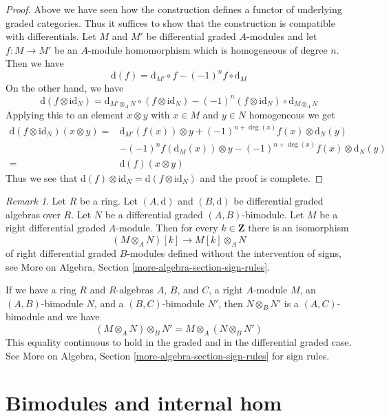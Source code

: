 \documentclass{stacks-project}
\theoremstyle{plain}
\theoremstyle{definition}
\theoremstyle{remark}
\newtheorem{remark}[subsection]{Remark}
\numberwithin{equation}{subsection}
\begin{document}
\begin{proof}
Above we have seen how the construction defines a functor of underlying
graded categories. Thus it suffices to show that the construction is
compatible with differentials. Let $M$ and $M'$ be differential
graded $A$-modules and let $f : M \to M'$ be an $A$-module homomorphism
which is homogeneous of degree $n$. Then we have
$$
\text{d}(f) = \text{d}_{M'} \circ f - (-1)^n f \circ \text{d}_M
$$
On the other hand, we have
$$
\text{d}(f \otimes \text{id}_N) =
\text{d}_{M' \otimes_A N} \circ
(f \otimes \text{id}_N)
- (-1)^n
(f \otimes \text{id}_N) \circ \text{d}_{M \otimes_A N}
$$
Applying this to an element $x \otimes y$ with $x \in M$ and
$y \in N$ homogeneous we get
\begin{align*}
\text{d}(f \otimes \text{id}_N)(x \otimes y)
= &
\text{d}_{M'}(f(x)) \otimes y + (-1)^{n + \deg(x)}f(x) \otimes \text{d}_N(y) \\
& - (-1)^n f(\text{d}_M(x)) \otimes y
- (-1)^{n + \deg(x)}f(x) \otimes \text{d}_N(y) \\
= &
\text{d}(f) (x \otimes y)
\end{align*}
Thus we see that $\text{d}(f) \otimes \text{id}_N =
\text{d}(f \otimes \text{id}_N)$ and the proof is complete.
\end{proof}

\begin{remark}
\label{remark-shift-tensor-no-sign}
Let $R$ be a ring. Let $(A, \text{d})$ and $(B, \text{d})$
be differential graded algebras over $R$. Let $N$ be a
differential graded $(A, B)$-bimodule. Let $M$ be a right differential
graded $A$-module. Then for every $k \in \mathbf{Z}$ there
is an isomorphism
$$
(M \otimes_A N)[k] \longrightarrow
M[k] \otimes_A N
$$
of right differential graded $B$-modules defined without the intervention
of signs, see More on Algebra, Section \ref{more-algebra-section-sign-rules}.
\end{remark}

\noindent
If we have a ring $R$ and $R$-algebras $A$, $B$, and $C$,
a right $A$-module $M$, an $(A, B)$-bimodule $N$, and a
$(B, C)$-bimodule $N'$, then
$N \otimes_B N'$ is a $(A, C)$-bimodule and we have
$$
(M \otimes_A N) \otimes_B N' = M \otimes_A (N \otimes_B N')
$$
This equality continuous to hold in the graded and in the differential
graded case. See More on Algebra, Section \ref{more-algebra-section-sign-rules}
for sign rules.






\section{Bimodules and internal hom}
\label{section-bimodules-hom}
\end{document}
